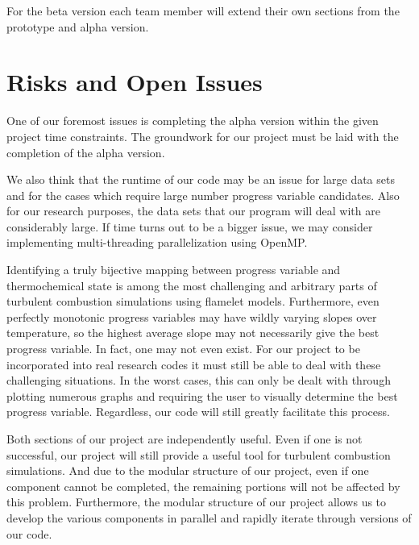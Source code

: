 \documentclass[11pt]{article}
\begin{document}
For the beta version each team member will extend their own sections from the prototype and alpha version. 


\section{Risks and Open Issues}
One of our foremost issues is completing the alpha version within the given project time constraints. The groundwork for our project must be laid with the completion of the alpha version. 

We also think that the runtime of our code may be an issue for large data sets and for the cases which require large number progress variable candidates. Also for our research purposes, the data sets that our program will deal with are considerably large. If time turns out to be a bigger issue, we may consider implementing multi-threading parallelization using OpenMP.

Identifying a truly bijective mapping between progress variable and thermochemical state is among the most challenging and arbitrary parts of turbulent combustion simulations using flamelet models. Furthermore, even perfectly monotonic progress variables may have wildly varying slopes over temperature, so the highest average slope may not necessarily give the best progress variable. In fact, one may not even exist. For our project to be incorporated into real research codes it must still be able to deal with these challenging situations. In the worst cases, this can only be dealt with through plotting numerous graphs and requiring the user to visually determine the best progress variable. Regardless, our code will still greatly facilitate this process.

Both sections of our project are independently useful. Even if one is not successful, our project will still provide a useful tool for turbulent combustion simulations. And due to the modular structure of our project, even if one component cannot be completed, the remaining portions will not be affected by this problem. Furthermore, the modular structure of our project allows us to develop the various components in parallel and rapidly iterate through versions of our code. 

\end{document}
